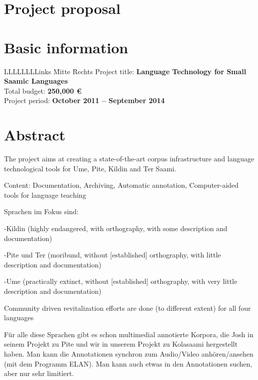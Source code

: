 \documentclass[a4paper,12pt]{article}
\begin{document}
\newpage

\section*{Project proposal}

\section{Basic information}

\begin{tabbing}
LLLLLLLLinks \= Mitte \= Rechts \kill
Project title: \>\textbf{Language Technology for Small Saamic Languages}\\
Total budget: \>\textbf{250,000 €}\\
Project period: \>\textbf{October 2011 – September 2014}\\
\end{tabbing}

\section{Abstract}%

The project aims at creating a state-of-the-art corpus infrastructure and language technological tools for Ume, Pite, Kildin and Ter Saami.

Content: Documentation, Archiving, Automatic annotation, Computer-aided tools for language teaching

Sprachen im Fokus sind:

-Kildin (highly endangered, with orthography, with some description and documentation)

-Pite und Ter (moribund, without [established] orthography, with little description and documentation)

-Ume (practically extinct, without [established] orthography, with very little description and documentation)

Community driven revitalization efforts are done (to different extent) for all four languages

Für alle diese Sprachen gibt es schon multimedial annotierte Korpora, die Josh in seinem Projekt zu Pite und wir in unserem Projekt zu Kolasaami hergestellt haben. Man kann die Annotationen synchron zum Audio/Video anhören/ansehen (mit dem Programm ELAN). Man kann auch etwas in den Annotationen suchen, aber nur sehr limitiert.
\end{document}
